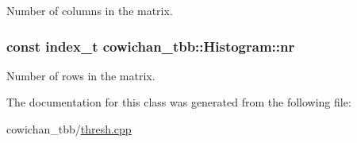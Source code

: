 Number of columns in the matrix. \hypertarget{classcowichan__tbb_1_1_histogram_aceebcf710541cd82d3d9d8fcef243cc}{
\subsubsection[{nr}]{\setlength{\rightskip}{0pt plus 5cm}const {\bf index\_\-t} {\bf cowichan\_\-tbb::Histogram::nr}}}
\label{classcowichan__tbb_1_1_histogram_aceebcf710541cd82d3d9d8fcef243cc}


Number of rows in the matrix. 

The documentation for this class was generated from the following file:\begin{CompactItemize}
\item 
cowichan\_\-tbb/\hyperlink{cowichan__tbb_2thresh_8cpp}{thresh.cpp}\end{CompactItemize}
